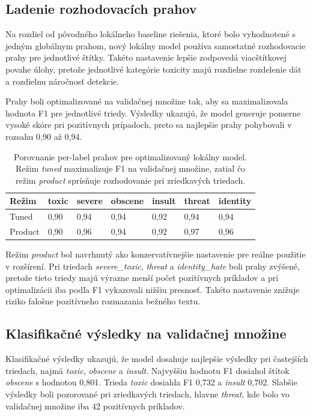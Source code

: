 \subsection{Ladenie rozhodovacích prahov}
Na rozdiel od pôvodného lokálneho baseline riešenia, ktoré bolo vyhodnotené s jedným globálnym prahom, nový lokálny model používa samostatné rozhodovacie prahy pre jednotlivé štítky. Takéto nastavenie lepšie zodpovedá viacštítkovej povahe úlohy, pretože jednotlivé kategórie toxicity majú rozdielne rozdelenie dát a rozdielnu náročnosť detekcie.

Prahy boli optimalizované na validačnej množine tak, aby sa maximalizovala hodnota F1 pre jednotlivé triedy. Výsledky ukazujú, že model generuje pomerne vysoké skóre pri pozitívnych prípadoch, preto sa najlepšie prahy pohybovali v rozsahu 0{,}90 až 0{,}94.

\FloatBarrier
\begin{table}[!htbp]
  \centering
  \small
  \renewcommand{\arraystretch}{1.15}
  \begin{tabularx}{\textwidth}{|p{3.2cm}|Y|Y|Y|Y|Y|Y|}
    \hline
    \textbf{Režim} &
    \textbf{toxic} &
    \textbf{severe} &
    \textbf{obscene} &
    \textbf{insult} &
    \textbf{threat} &
    \textbf{identity} \\
    \hline
    Tuned &
    0{,}90 &
    0{,}94 &
    0{,}94 &
    0{,}92 &
    0{,}94 &
    0{,}94 \\
    \hline
    Product &
    0{,}90 &
    0{,}96 &
    0{,}94 &
    0{,}92 &
    0{,}97 &
    0{,}96 \\
    \hline
  \end{tabularx}
  \caption[Prahy pre lokálny Char-CNN model]{Porovnanie per-label prahov pre optimalizovaný lokálny model. Režim \emph{tuned} maximalizuje F1 na validačnej množine, zatiaľ čo režim \emph{product} sprísňuje rozhodovanie pri zriedkavých triedach.}
  \label{tab:local_charcnn_thresholds}
\end{table}
\FloatBarrier

Režim \emph{product} bol navrhnutý ako konzervatívnejšie nastavenie pre reálne použitie v rozšírení. Pri triedach \emph{severe\_toxic}, \emph{threat} a \emph{identity\_hate} boli prahy zvýšené, pretože tieto triedy majú výrazne menší počet pozitívnych príkladov a pri optimalizácii iba podľa F1 vykazovali nižšiu presnosť. Takéto nastavenie znižuje riziko falošne pozitívneho rozmazania bežného textu.

\subsection{Klasifikačné výsledky na validačnej množine}
Klasifikačné výsledky ukazujú, že model dosahuje najlepšie výsledky pri častejších triedach, najmä \emph{toxic}, \emph{obscene} a \emph{insult}. Najvyššiu hodnotu F1 dosiahol štítok \emph{obscene} s hodnotou 0{,}801. Trieda \emph{toxic} dosiahla F1 0{,}732 a \emph{insult} 0{,}702. Slabšie výsledky boli pozorované pri zriedkavých triedach, hlavne \emph{threat}, kde bolo vo validačnej množine iba 42 pozitívnych príkladov.

